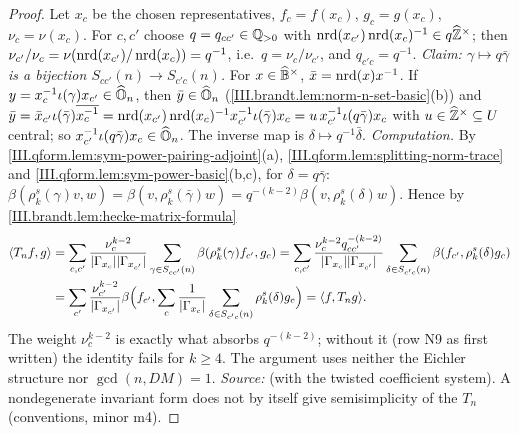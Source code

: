 \begin{theorem}
\end{theorem}
\begin{proof}
Let $x_c$ be the chosen representatives, $f_c=f(x_c)$, $g_c=g(x_c)$, $\nu_c=\nu(x_c)$. For $c,c'$ choose $q=q_{cc'}\in\mathbb{Q}_{>0}$ with
$\operatorname{nrd}(x_{c'})\operatorname{nrd}(x_c)^{-1}\in q\widehat{\mathbb{Z}}^\times$; then $\nu_{c'}/\nu_c=\nu(\operatorname{nrd}(x_{c'})/\operatorname{nrd}(x_c))=q^{-1}$, i.e.\ $q=\nu_c/\nu_{c'}$, and $q_{c'c}=q^{-1}$.
\emph{Claim: $\gamma\mapsto q\bar\gamma$ is a bijection $S_{cc'}(n)\to S_{c'c}(n)$.} For $x\in\widehat{\mathbb{B}}^\times$, $\bar x=\operatorname{nrd}(x)x^{-1}$. If
$y=x_c^{-1}\iota(\gamma)x_{c'}\in\widehat{\mathbb{O}}_n$, then $\bar y\in\widehat{\mathbb{O}}_n$ (\cref{III.brandt.lem:norm-n-set-basic}(b)) and
$\bar y=\bar x_{c'}\iota(\bar\gamma)\overline{x_c^{-1}}=\operatorname{nrd}(x_{c'})\operatorname{nrd}(x_c)^{-1}x_{c'}^{-1}\iota(\bar\gamma)x_c=u\,x_{c'}^{-1}\iota(q\bar\gamma)x_c$ with $u\in\widehat{\mathbb{Z}}^\times\subseteq U$
central; so $x_{c'}^{-1}\iota(q\bar\gamma)x_c\in\widehat{\mathbb{O}}_n$. The inverse map is $\delta\mapsto q^{-1}\bar\delta$. \emph{Computation.} By
\cref{III.qform.lem:sym-power-pairing-adjoint}(a), \cref{III.qform.lem:splitting-norm-trace} and \cref{III.qform.lem:sym-power-basic}(b,c), for
$\delta=q\bar\gamma$: $\beta(\rho_k^s(\gamma)v,w)=\beta(v,\rho_k^s(\bar\gamma)w)=q^{-(k-2)}\beta(v,\rho_k^s(\delta)w)$. Hence by
\cref{III.brandt.lem:hecke-matrix-formula}
\begin{align*}
  \langle T_nf,g\rangle&=\sum_{c,c'}\frac{\nu_c^{k-2}}{\lvert\Gamma_{x_c}\rvert\lvert\Gamma_{x_{c'}}\rvert}\sum_{\gamma\in S_{cc'}(n)}\beta(\rho_k^s(\gamma)f_{c'},g_c)
  =\sum_{c,c'}\frac{\nu_c^{k-2}q_{cc'}^{-(k-2)}}{\lvert\Gamma_{x_c}\rvert\lvert\Gamma_{x_{c'}}\rvert}\sum_{\delta\in S_{c'c}(n)}\beta(f_{c'},\rho_k^s(\delta)g_c)\\
  &=\sum_{c'}\frac{\nu_{c'}^{k-2}}{\lvert\Gamma_{x_{c'}}\rvert}\beta\Bigl(f_{c'},\sum_c\frac1{\lvert\Gamma_{x_c}\rvert}\sum_{\delta\in S_{c'c}(n)}\rho_k^s(\delta)g_c\Bigr)=\langle f,T_ng\rangle.
\end{align*}
The weight $\nu_c^{k-2}$ is exactly what absorbs $q^{-(k-2)}$; without it (row N9 as first written) the identity fails for $k\ge4$. The argument uses
neither the Eichler structure nor $\gcd(n,DM)=1$. \emph{Source:} \cite[Lemma~2.2, p.~173]{Shz} (with the twisted coefficient system). A
nondegenerate invariant form does not by itself give semisimplicity of the $T_n$ (conventions, minor m4).
\end{proof}

